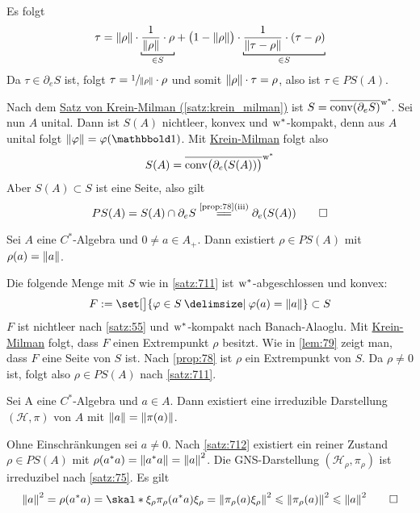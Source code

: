 \begin{beweis}
\begin{itemize}
		Es folgt
		\[
			\tau = \norm*{\rho} \cdot \Underbracket{\frac{1}{\norm*{\rho}} \cdot \rho}{\in S} + \enbrace[\big]{1- \norm*{\rho}} \cdot \Underbracket{\frac{1}{\norm*{\tau - \rho}} \cdot (\tau - \rho)}{\in S}  
		\]
		Da $\tau \in \partial_e S$ ist, folgt $\tau = \sfrac{1}{\norm*{\rho}} \cdot \rho$ und somit $\norm*{\rho} \cdot \tau =\rho$, also ist $\tau \in PS(A)$.
	\end{itemize}
	Nach dem \hyperref[satz:krein_milman]{Satz von Krein-Milman (\ref*{satz:krein_milman})} ist $S= \overline{\conv(\partial_e S)}^{\raisemath{-.4ex}{\w^*}}\!$.
	Sei nun $A$ unital.
	Dann ist $S(A)$ nichtleer, konvex und $\w^*$-kompakt, denn aus $A$ unital folgt $\norm*{\varphi}=\varphi(\ind)$.
	Mit \hyperref[satz:krein_milman]{Krein-Milman} folgt also
	\[
		S(A) = \overline{\conv \enbrace[\big]{\partial_e \enbrace*{S(A)}}}^{\w^*}
	\]
	Aber $S(A) \subset S$ ist eine Seite, also gilt 
	\[
		PS(A) =S(A) \cap \partial_e S \StackText{\ref{prop:78}(iii)}{=\joinrel=} \partial_e \enbrace*{S(A)} \qedhere
	\]
\end{beweis}

\begin{satz}[label=satz:712,{name=[{reiner Zustand der Norm von $a \in A$ realisiert}]}]
	Sei $A$ eine $C^*$-Algebra und $0\neq a \in A_+$.
	Dann existiert $\rho \in PS(A)$ mit $\rho(a)=\norm*{a}$.
\end{satz}
\begin{beweis}
	Die folgende Menge mit $S$ wie in \autoref{satz:711} ist $\w^*$-abgeschlossen und konvex:
	\[
		F := \set[\big]{\varphi \in S \given \varphi(a)=\norm*{a}} \subset S
	\]
	$F$ ist nichtleer nach \autoref{satz:55} und $\w^*$-kompakt nach Banach-Alaoglu.
	Mit \hyperref[satz:krein_milman]{Krein-Milman} folgt, dass $F$ einen Extrempunkt $\rho$ besitzt.
	Wie in \autoref{lem:79} zeigt man, dass $F$ eine Seite von $S$ ist.
	Nach \autoref{prop:78} ist $\rho$ ein Extrempunkt von $S$.
	Da $\rho\neq0$ ist, folgt also $\rho \in PS(A)$ nach \autoref{satz:711}.
\end{beweis}

\begin{korollar}[label=korr:713,{name=[{irreduzible Darstellung, die die Norm von $a \in A$ erhält}]}]
	Sei A eine $C^*$-Algebra und $a \in A$.
	Dann existiert eine irreduzible Darstellung $(\mathcal{H},\pi)$ von $A$ mit $\norm*{a}= \norm*{\pi(a)}$.
\end{korollar}
\begin{beweis}
	Ohne Einschränkungen sei $a \neq 0$.
	Nach \autoref{satz:712} existiert ein reiner Zustand $\rho \in PS(A)$ mit $\rho(a^*a)=\norm*{a^*a}=\norm*{a}^2$.
	Die GNS-Darstellung $(\mathcal{H}_\rho,\pi_\rho)$ ist irreduzibel nach \autoref{satz:75}.
	Es gilt
	\[
		\norm*{a}^2 = \rho(a^*a) = \skal*{\xi_\rho}{\pi_\rho(a^*a)\xi_\rho} = \norm*{\pi_\rho(a) \xi_\rho}^2 \le \norm*{\pi_\rho(a)}^2 \le \norm*{a}^2 \qedhere
	\]
\end{beweis}

